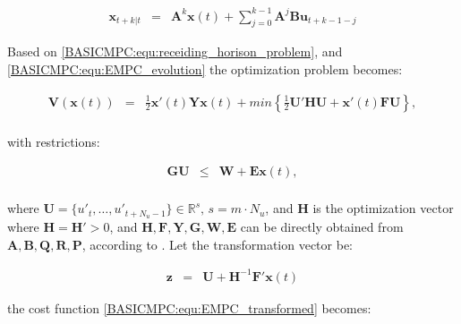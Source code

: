\begin{equation}
        \begin{array}{rcl}
				\textbf{x}_{t+k|t}&=&\textbf{A}^k\textbf{x}(t)+\sum^{k-1}_{j=0}\textbf{A}^j\textbf{Bu}_{t+k-1-j}
        \end{array}
        \label{BASICMPC:equ:EMPC_evolution}
    \end{equation}

Based on \ref{BASICMPC:equ:receiding_horison_problem}, and \ref{BASICMPC:equ:EMPC_evolution} the optimization problem becomes:

\begin{equation}
        \begin{array}{rcl}
				\textbf{V}(\textbf{x}(t))&=&\frac{1}{2}\textbf{x}'(t)\textbf{Yx}(t)+min\left\{\frac{1}{2}\textbf{U}'\textbf{HU}+\textbf{x}'(t)\textbf{FU}\right\},\\
        \end{array}
        \label{BASICMPC:equ:EMPC_transformed}
    \end{equation}
		
		with restrictions:
		
		\begin{equation}
        \begin{array}{rcl}
				\textbf{GU}&\leq& \textbf{W}+\textbf{Ex}(t),\\
        \end{array}
        \label{BASICMPC:equ:EMPC_transformed_2}
    \end{equation}
		
		where $\textbf{U}=\{u'_t,\dots,u'_{t+N_u-1}\}\in\mathbb{R}^s,\,s=m\cdot N_u$, and $\textbf{H}$ is the optimization vector where $\textbf{H}=\textbf{H}'>0$, and $\textbf{H},\textbf{F},\textbf{Y},\textbf{G},\textbf{W},\textbf{E}$ can be directly obtained from $\textbf{A},\textbf{B},\textbf{Q},\textbf{R},\textbf{P}$, according to \cite{borrelli2017predictive}. Let the transformation vector be:
		
		\begin{equation}
        \begin{array}{rcl}
				\textbf{z}&=&\textbf{U}+\textbf{H}^{-1}\textbf{F}'\textbf{x}(t)
        \end{array}
        \label{BASICMPC:equ:EMPC_trans_var}
    \end{equation}
		
		the cost function \ref{BASICMPC:equ:EMPC_transformed} becomes:
		
